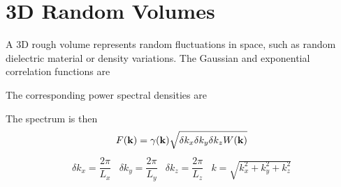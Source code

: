 {\scriptsize %
{}
}

\clearpage


\section{3D Random Volumes}

A 3D rough volume represents random fluctuations in space, such as random dielectric material or density variations. The Gaussian and exponential correlation functions are

The corresponding power spectral densities are

The spectrum is then 
\begin{equation}
F(\mathbf{k}) = \gamma(\mathbf{k})\sqrt{\delta k_x \delta k_y \delta k_z W(\mathbf{k})} 
\end{equation}
\begin{equation}
\begin{array}{cccc}
\delta k_x = \dfrac{2\pi}{L_x} & \delta k_y = \dfrac{2\pi}{L_y} & \delta k_z = \dfrac{2\pi}{L_z} & k = \sqrt{k_x^2 + k_y^2 + k_z^2}
\end{array}
\end{equation}


